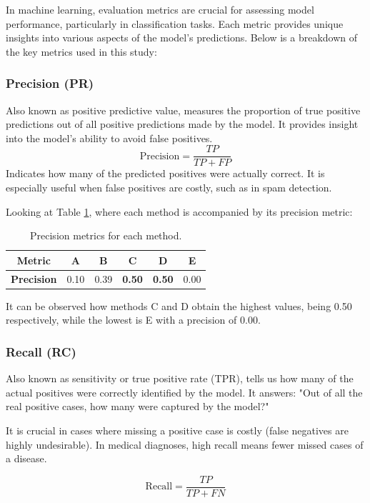 \documentclass{llncs}
\begin{document}
In machine learning, evaluation metrics are crucial for assessing model performance, particularly in classification tasks. Each metric provides unique insights into various aspects of the model's predictions. Below is a breakdown of the key metrics used in this study:

\subsubsection{Precision (PR)}
Also known as positive predictive value, measures the proportion of true positive predictions out of all positive predictions made by the model. It provides insight into the model's ability to avoid false positives.
\[
\text{Precision} = \frac{TP}{TP + FP}
\]
Indicates how many of the predicted positives were actually correct. It is especially useful when false positives are costly, such as in spam detection.

Looking at Table \ref*{tab:precision}, where each method is accompanied by its precision metric:
\begin{table}[h]
	\centering
	\begin{tabular}{|c|c|c|c|c|c|} 
		\hline 
		\textbf{Metric} & \textbf{A} & \textbf{B} & \textbf{C} & \textbf{D} & \textbf{E} \\ 
		\hline 
		\textbf{Precision} & 0.10 & 0.39 & \textbf{0.50} & \textbf{0.50} & 0.00 \\ 
		\hline 
	\end{tabular} 
	\caption{Precision metrics for each method.} 
	\label{tab:precision} 
\end{table} 
\vspace{-20pt}


It can be observed how methods C and D obtain the highest values, being 0.50 respectively, while the lowest is E with a precision of 0.00.

\subsubsection{Recall (RC)}
Also known as sensitivity or true positive rate (TPR), tells us how many of the actual positives were correctly identified by the model. It answers: "Out of all the real positive cases, how many were captured by the model?"

It is crucial in cases where missing a positive case is costly (false negatives are highly undesirable). In medical diagnoses, high recall means fewer missed cases of a disease.

\[
\text{Recall} = \frac{TP}{TP + FN}
\]
\end{document}
